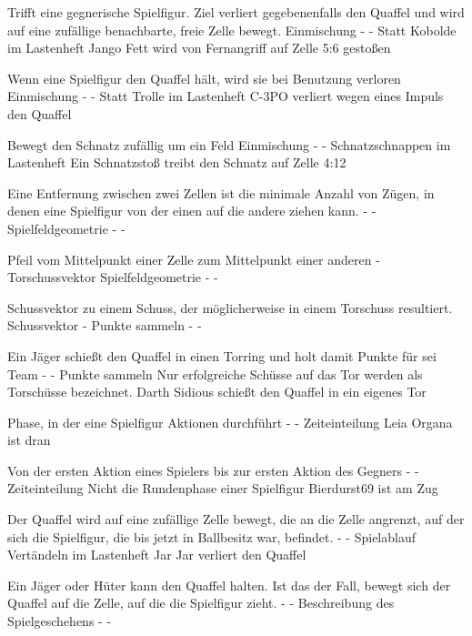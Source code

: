 {Trifft eine gegnerische Spielfigur. Ziel verliert gegebenenfalls den Quaffel und wird auf eine zufällige benachbarte, freie Zelle bewegt.}
{Einmischung}
{-}
{-}
{Statt \glqq{}Kobolde\grqq{}  im Lastenheft}
{Jango Fett wird von Fernangriff auf Zelle 5:6 gestoßen}

{Wenn eine Spielfigur den Quaffel hält, wird sie bei Benutzung verloren}
{Einmischung}
{-}
{-}
{Statt \glqq{}Trolle\grqq{}  im Lastenheft}
{C-3PO verliert wegen eines Impuls den Quaffel}

{Bewegt den Schnatz zufällig um ein Feld}
{Einmischung}
{-}
{-}
{\glqq{}Schnatzschnappen\grqq{}  im Lastenheft}
{Ein Schnatzstoß treibt den Schnatz auf Zelle 4:12}

{Eine Entfernung zwischen zwei Zellen ist die minimale Anzahl von Zügen, in denen eine Spielfigur von der einen auf die andere ziehen kann.}
{-}
{-}
{Spielfeldgeometrie}
{-}
{-}

{Pfeil vom Mittelpunkt einer Zelle zum Mittelpunkt einer anderen}
{-}
{Torschussvektor}
{Spielfeldgeometrie}
{-}
{-}

{Schussvektor zu einem Schuss, der möglicherweise in einem Torschuss resultiert.}
{Schussvektor}
{-}
{Punkte sammeln}
{-}
{-}

{Ein Jäger schießt den Quaffel in einen Torring und holt damit Punkte für sei Team}
{-}
{-}
{Punkte sammeln}
{Nur erfolgreiche Schüsse auf das Tor werden als Torschüsse bezeichnet.}
{Darth Sidious schießt den Quaffel in ein eigenes Tor}

{Phase, in der eine Spielfigur Aktionen durchführt}
{-}
{-}
{Zeiteinteilung}
{}
{Leia Organa ist dran}

{Von der ersten Aktion eines Spielers bis zur ersten Aktion des Gegners}
{-}
{-}
{Zeiteinteilung}
{Nicht die Rundenphase einer Spielfigur}
{Bierdurst69 ist am Zug}

{Der Quaffel wird auf eine zufällige Zelle bewegt, die an die Zelle angrenzt, auf der sich die Spielfigur, die bis jetzt in Ballbesitz war, befindet.}
{-}
{-}
{Spielablauf}
{\glqq{}Vertändeln\grqq{}  im Lastenheft}
{Jar Jar verliert den Quaffel}

{Ein Jäger oder Hüter kann den Quaffel halten. Ist das der Fall, bewegt sich der Quaffel auf die Zelle, auf die die Spielfigur zieht.}
{-}
{-}
{Beschreibung des Spielgeschehens}
{-}
{-}

